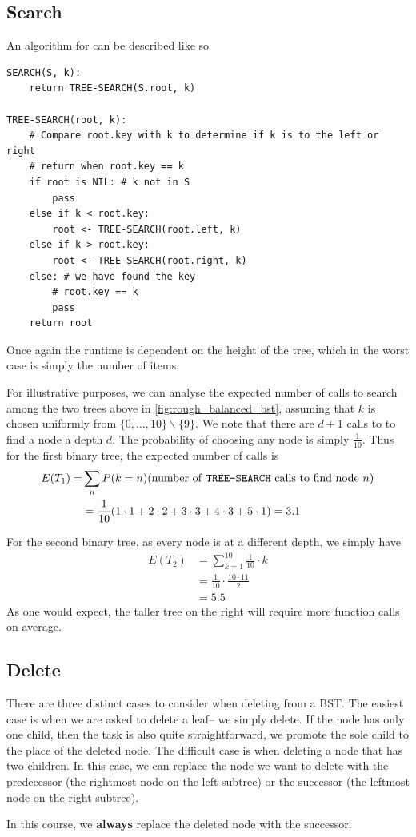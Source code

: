 \subsection{Search}
An algorithm for  can be described like so
\begin{lstlisting}
SEARCH(S, k):
    return TREE-SEARCH(S.root, k)
    
TREE-SEARCH(root, k):
    # Compare root.key with k to determine if k is to the left or right
    # return when root.key == k
    if root is NIL: # k not in S
        pass
    else if k < root.key:
        root <- TREE-SEARCH(root.left, k)
    else if k > root.key:
        root <- TREE-SEARCH(root.right, k)
    else: # we have found the key
        # root.key == k
        pass
    return root
\end{lstlisting}

Once again the runtime is dependent on the height of the tree, which in the worst case is simply the number of items.


For illustrative purposes, we can analyse the expected number of calls to search among the two trees above in \autoref{fig:rough_balanced_bst}, assuming that $k$ is chosen uniformly from $\{0, \dots, 10\} \backslash \{9\}$. We note that there are $d + 1$ calls to  to find a node a depth $d$. The probability of choosing any node is simply $\frac{1}{10}$. Thus for the first binary tree, the expected number of calls is
\begin{align*}
    E(T_1) = &\sum_{n} P(k = n)(\text{number of \texttt{TREE-SEARCH} calls to find node }n)\\
    &=\frac{1}{10}(1 \cdot 1 + 2 \cdot 2 + 3 \cdot 3 + 4 \cdot 3 + 5 \cdot 1) = 3.1
\end{align*}

For the second binary tree, as every node is at a different depth, we simply have
\begin{align*}
    E(T_2) &= \sum_{k = 1}^{10} \frac{1}{10} \cdot k\\
    &= \frac{1}{10} \cdot \frac{10 \cdot 11}{2}\\
    &= 5.5
\end{align*}
As one would expect, the taller tree on the right will require more function calls on average.

\subsection{Delete}
There are three distinct cases to consider when deleting from a BST. The easiest case is when we are asked to delete a leaf-- we simply delete. If the node has only one child, then the task is also quite straightforward, we promote the sole child to the place of the deleted node. The difficult case is when deleting a node that has two children. In this case, we can replace the node we want to delete with the predecessor (the rightmost node on the left subtree) or the successor (the leftmost node on the right subtree).
\begin{remark}
    In this course, we \textbf{always} replace the deleted node with the successor.
\end{remark}

